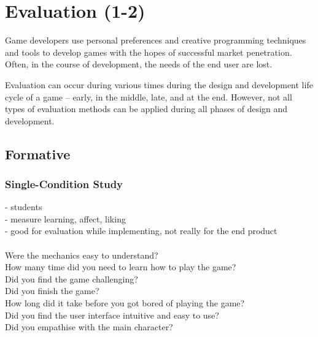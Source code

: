 
\chapter{Evaluation (1-2)} %

\label{Chapter4} %



Game developers use personal preferences and creative programming techniques and tools to develop games with the hopes of successful market penetration. Often, in the course of development, the needs of the end user are lost. 

Evaluation can occur during various times during the design and development life cycle of a game – early, in the middle, late, and at the end. However, not all types of evaluation methods can be applied during all phases of design and development.

\section{Formative}
\subsection{Single-Condition Study}
 - students \\
 - measure learning, affect, liking \\
 - good for evaluation while implementing, not really for the end product \\
 \\
Were the mechanics easy to understand? \\
How many time did you need to learn how to play the game? \\
Did you find the game challenging? \\
Did you finish the game? \\
How long did it take before you got bored of playing the game? \\
Did you find the user interface intuitive and easy to use? \\
Did you empathise with the main character? \\

 
 
